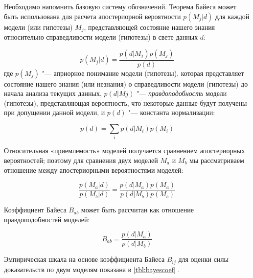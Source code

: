 Необходимо напомнить базовую систему обозначений. Теорема Байеса может быть использована для расчета апостериорной 
вероятности $p(M_j|d)$ для каждой модели (или гипотезы) $M_j$, представляющей состояние нашего знания относительно 
справедливости модели (гипотезы) в свете данных $d$:

\begin{equation}
p(M_j|d) = \frac{p(d|M_j)p(M_j)}{p(d)} 
\end{equation}
где $p(M_j)$ "--- априорное понимание модели (гипотезы), которая представляет состояние нашего знания (или незнания) 
о справедливости модели (гипотезы) до начала анализа текущих данных, $p(d|Mj)$ "--- \textit{правдоподобность} модели 
(гипотезы), представляющая вероятность, что некоторые данные будут получены при допущении данной модели, 
и $p(d)$ "--- константа нормализации:

\begin{equation}
p(d) = \sum_{i} p\left( d|M_i\right) p(M_i)  
\end{equation}

Относительная «приемлемость» моделей получается сравнением апостериорных вероятностей; поэтому для сравнения двух 
моделей $M_a$ и $M_b$ мы рассматриваем отношение между апостериорными вероятностями моделей:

\begin{equation}
\frac{p(M_a|d)}{p(M_b|d)} = \frac{p(d|M_a)p(M_a)}{p(d|M_b)p(M_b)} 
\end{equation}

Коэффициент Байеса $B_{ab}$ может быть рассчитан как отношение правдоподобностей моделей:

\begin{equation}
B_{ab} = \frac{p(d|M_a)}{p(d|M_b)}
\end{equation}

Эмпирическая шкала на основе коэффициента Байеса $B_{ij}$ для оценки силы доказательств по двум моделям показана 
в \cref{tbl:bayescoef} \cite{march2011should}.

